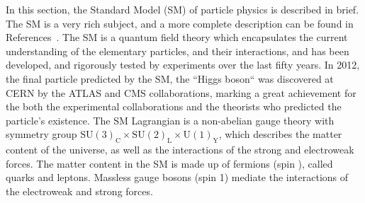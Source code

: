 In this section, the Standard Model (SM) of particle physics is described in
brief.
The SM is a very rich subject, and a more complete description can be found in
References~\cite{Agashe:2014kda,opac-b1131978,halzen1984quarks}.
The SM is a quantum field theory which encapsulates the current understanding
of the elementary particles, and their interactions, and has been developed,
and rigorously tested by experiments over the last fifty years.
In 2012, the final particle predicted by the SM, the ``Higgs boson`` was
discovered at CERN by the ATLAS and CMS collaborations, marking a great
achievement for the both the experimental collaborations and the theorists
who predicted the particle's existence.
The SM Lagrangian is a non-abelian gauge theory with symmetry group 
$\mathrm{SU}(3)_\mathrm{C} \times
\mathrm{SU}(2)_\mathrm{L} \times
\mathrm{U}(1)_\mathrm{Y}$,
which describes the matter content of the universe, as well as the interactions
of the strong and electroweak forces.
The matter content in the SM is made up of fermions (spin ),
called quarks and leptons.
Massless gauge bosons (spin 1) mediate the interactions of the electroweak and
strong forces.

\begin{figure}[ht]
\end{figure}


